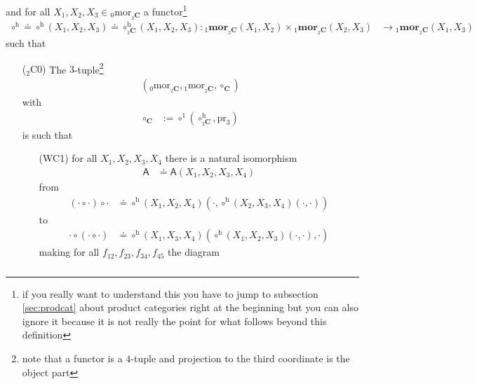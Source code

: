 and for all $X_{1},X_{2},X_{3} \in {}_{0}\mathrm{mor}_{{}_{2}\mathbf{C}}$ a functor\footnote{if you really want to understand this you have to jump to subsection \ref{sec:prodcat} about product categories right at the beginning but you can also ignore it because it is not really the point for what follows beyond this definition}
\begin{align*}
  \circ^{\textrm{h}}
  \doteq
  \circ^{\textrm{h}}(X_{1},X_{2},X_{3})
  \doteq
  \circ_{{}_{2}{\mathbf{C}}}^{\textrm{h}}(X_{1},X_{2},X_{3})
  \colon
  {}_{1}\mathbf{mor}_{{}_{2}\mathbf{C}}(X_{1},X_{2})
  \times
  {}_{1}\mathbf{mor}_{{}_{2}\mathbf{C}}(X_{2},X_{3})
  &\rightarrow
  {}_{1}\mathbf{mor}_{{}_{2}\mathbf{C}}(X_{1},X_{3})
\end{align*}
such that
\begin{enumerate}
\item[(${}_{2}$C0)]
The $3$-tuple\footnote{note that a functor is a $4$-tuple and projection to the third coordinate is the object part}
\begin{align*}
  \left(
    {}_{0}\mathrm{mor}_{{}_{2}\mathbf{C}},
    {}_{1}\mathrm{mor}_{{}_{2}\mathbf{C}},
    \circ_{\mathbf{C}}
  \right)
\end{align*}
with
\begin{align*}
  \circ_{\mathbf{C}}
  &:=
  \circ^{1}
  \left(
    \circ_{{}_{2}\mathbf{C}}^{\textrm{h}},
    \mathrm{pr}_{3}
  \right)
\end{align*}
is such that
\begin{enumerate}
\item[(WC1)]
for all $X_{1},X_{2},X_{3},X_{4}$ there is a natural isomorphism
\begin{align*}
  \mathsf{A}
  &\doteq
  \mathsf{A}
  \left(
    X_{1},
    X_{2},
    X_{3},
    X_{4}
  \right)
\end{align*}
from
\begin{align*}
  \left(
    \cdot
    \circ
    \cdot
  \right)
  \circ
  \cdot
  &\doteq
  \circ^{\textrm{h}}(X_{1},X_{2},X_{4})
  \left(
    \cdot,
    \circ^{\textrm{h}}
    (X_{2},X_{3},X_{4})
    (\cdot,\cdot)
  \right)
\end{align*}
to
\begin{align*}
  \cdot
  \circ
  \left(
    \cdot
    \circ
    \cdot
  \right)
  &\doteq
  \circ^{\textrm{h}}
  (X_{1},X_{3},X_{4})
  \left(
    \circ^{\textrm{h}}
    (X_{1},X_{2},X_{3})
    (\cdot,\cdot),
    \cdot
  \right)
\end{align*}
making for all $f_{12},f_{23},f_{34},f_{45}$ the diagram
\[
\begin{tikzcd}[row sep=3.5em,column sep=0.4em]

\end{tikzcd}\]
\end{enumerate}
\end{enumerate}

